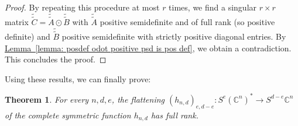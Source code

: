 \documentclass[11pt]{article}
\numberwithin{equation}{section}
\newtheorem{theorem}{Theorem}[section]
\theoremstyle{definition}
\theoremstyle{plain}
\newcommand{\expref}[2]{\hyperref[#2]{#1~\ref{#2}}}
\newcommand{\bbC}{\mathbb{C}}
\renewcommand{\tilde}[1]{\widetilde{#1}}
\begin{document}
\begin{proof}
By repeating this procedure at most $r$ times, we find a singular $r\times r$ matrix $\tilde{\tilde{C}} =  \tilde{\tilde{A}} \odot \tilde{\tilde{B}}$ with $\tilde{\tilde{A}}$ positive semidefinite and of full rank (so positive definite) and $\tilde{\tilde{B}}$ positive semidefinite with strictly positive diagonal entries. By \expref{Lemma}{lemma: posdef odot positive psd is pos def}, we obtain a contradiction. This concludes the proof.
\end{proof}

Using these results, we can finally prove:

\begin{theorem}\label{thm: hnd have maximal catalecticant rank}
 For every $n,d,e$, the flattening $(h_{n,d})_{e,d-e} : S^e (\bbC^n)^* \to S^{d-e} \bbC^n$ of the complete symmetric function $h_{n,d}$ has full rank.
\end{theorem}
\end{document}

